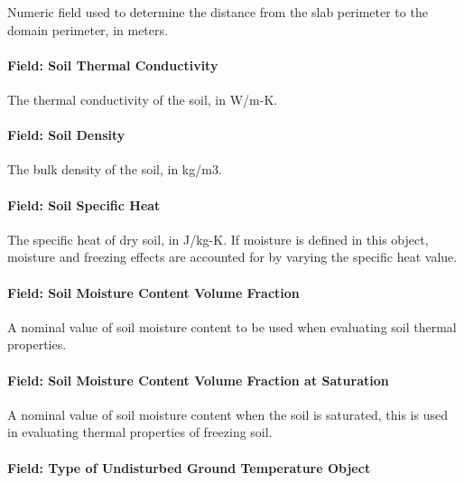 Numeric field used to determine the distance from the slab perimeter to the domain perimeter, in meters.

\paragraph{Field: Soil Thermal Conductivity}\label{field-soil-thermal-conductivity-3}

The thermal conductivity of the soil, in W/m-K.

\paragraph{Field: Soil Density}\label{field-soil-density-3}

The bulk density of the soil, in kg/m3.

\paragraph{Field: Soil Specific Heat}\label{field-soil-specific-heat-3}

The specific heat of dry soil, in J/kg-K. If moisture is defined in this object, moisture and freezing effects are accounted for by varying the specific heat value.

\paragraph{Field: Soil Moisture Content Volume Fraction}\label{field-soil-moisture-content-volume-fraction-1}

A nominal value of soil moisture content to be used when evaluating soil thermal properties.

\paragraph{Field: Soil Moisture Content Volume Fraction at Saturation}\label{field-soil-moisture-content-volume-fraction-at-saturation-1}

A nominal value of soil moisture content when the soil is saturated, this is used in evaluating thermal properties of freezing soil.

\paragraph{Field: Type of Undisturbed Ground Temperature Object}\label{field-type-of-undisturbed-ground-temperature-object-000}

